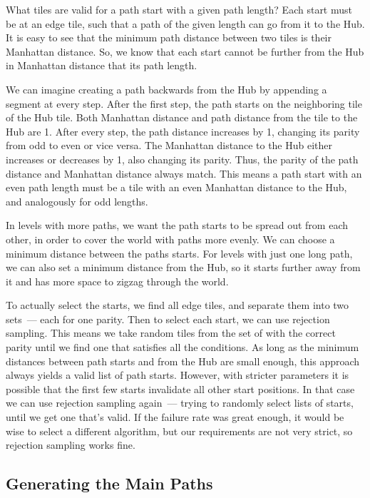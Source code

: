 What tiles are valid for a path start with a given path length?
Each start must be at an edge tile, such that a path of the given length can go from it to the Hub.
It is easy to see that the minimum path distance between two tiles is their Manhattan distance.
So, we know that each start cannot be further from the Hub in Manhattan distance that its path length.

We can imagine creating a path backwards from the Hub by appending a segment at every step.
After the first step, the path starts on the neighboring tile of the Hub tile.
Both Manhattan distance and path distance from the tile to the Hub are 1.
After every step, the path distance increases by 1, changing its parity from odd to even or vice versa.
The Manhattan distance to the Hub either increases or decreases by 1, also changing its parity.
Thus, the parity of the path distance and Manhattan distance always match.
This means a path start with an even path length must be a tile with an even Manhattan distance to the Hub, and analogously for odd lengths.

In levels with more paths, we want the path starts to be spread out from each other, in order to cover the world with paths more evenly.
We can choose a minimum distance between the paths starts.
For levels with just one long path, we can also set a minimum distance from the Hub, so it starts further away from it and has more space to zigzag through the world.

To actually select the starts, we find all edge tiles, and separate them into two sets~--- each for one parity.
Then to select each start, we can use rejection sampling.
This means we take random tiles from the set of with the correct parity until we find one that satisfies all the conditions.
As long as the minimum distances between path starts and from the Hub are small enough, this approach always yields a valid list of path starts.
However, with stricter parameters it is possible that the first few starts invalidate all other start positions.
In that case we can use rejection sampling again~--- trying to randomly select lists of starts, until we get one that's valid.
If the failure rate was great enough, it would be wise to select a different algorithm, but our requirements are not very strict, so rejection sampling works fine.

\subsection{Generating the Main Paths}

